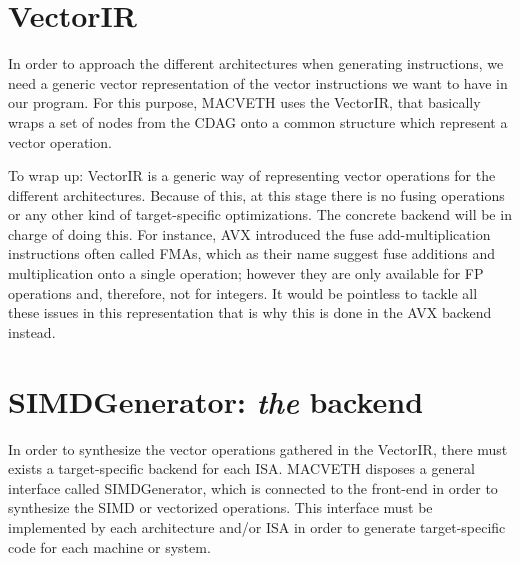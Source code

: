 \documentclass[a4paper,12pt]{memoir}
\begin{document}
\section{VectorIR}
In order to approach the different architectures when generating instructions,
we need a generic vector representation of the vector instructions we want to
have in our program. For this purpose, MACVETH uses the VectorIR, that basically
wraps a set of nodes from the CDAG onto a common structure which represent a vector operation.

To wrap up: VectorIR is a generic way of representing vector operations for the different
architectures. Because of this, at this stage there is no fusing operations or
any other kind of target-specific optimizations. The concrete backend will be in
charge of doing this. For instance, AVX introduced the fuse add-multiplication
instructions often called FMAs, which as their name suggest fuse additions and
multiplication onto a single operation; however they are only available for FP
operations and, therefore, not for integers. It would be pointless to tackle
all these issues in this representation that is why this is done in the AVX
backend instead.

\section{SIMDGenerator: \textit{the} backend}
In order to synthesize the vector operations gathered in the VectorIR, there
must exists a target-specific backend for each ISA. MACVETH disposes a general
interface called SIMDGenerator, which is connected to the front-end in order to
synthesize the SIMD or vectorized operations. This interface must be
implemented by each architecture and/or ISA in order to generate
target-specific code for each machine or system.





\end{document}
